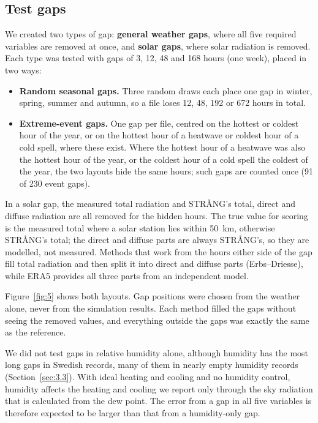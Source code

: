 \subsection{Test gaps}\label{sec:4.3}

We created two types of gap: \textbf{general weather gaps}, where all five required variables are removed at once, and \textbf{solar gaps}, where solar radiation is removed. Each type was tested with gaps of 3, 12, 48 and 168 hours (one week), placed in two ways:

\begin{itemize}
\item
  \textbf{Random seasonal gaps.} Three random draws each place one gap in winter, spring, summer and autumn, so a file loses 12, 48, 192 or 672 hours in total.
\item
  \textbf{Extreme-event gaps.} One gap per file, centred on the hottest or coldest hour of the year, or on the hottest hour of a heatwave or coldest hour of a cold spell, where these exist. Where the hottest hour of a heatwave was also the hottest hour of the year, or the coldest hour of a cold spell the coldest of the year, the two layouts hide the same hours; such gaps are counted once (91 of 230 event gaps).
\end{itemize}

In a solar gap, the measured total radiation and STRÅNG's total, direct and diffuse radiation are all removed for the hidden hours. The true value for scoring is the measured total where a solar station lies within 50~km, otherwise STRÅNG's total; the direct and diffuse parts are always STRÅNG's, so they are modelled, not measured. Methods that work from the hours either side of the gap fill total radiation and then split it into direct and diffuse parts (Erbs--Driesse), while ERA5 provides all three parts from an independent model.

Figure~\ref{fig:5} shows both layouts. Gap positions were chosen from the weather alone, never from the simulation results. Each method filled the gaps without seeing the removed values, and everything outside the gaps was exactly the same as the reference.

We did not test gaps in relative humidity alone, although humidity has the most long gaps in Swedish records, many of them in nearly empty humidity records (Section~\ref{sec:3.3}). With ideal heating and cooling and no humidity control, humidity affects the heating and cooling we report only through the sky radiation that is calculated from the dew point. The error from a gap in all five variables is therefore expected to be larger than that from a humidity-only gap.

